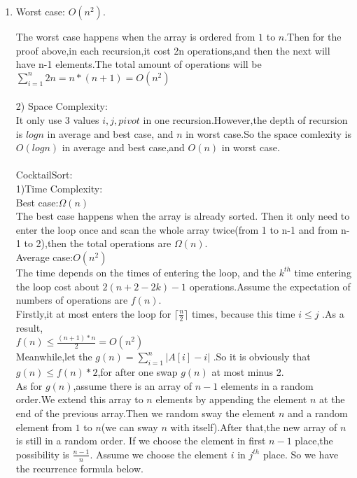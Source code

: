 \documentclass[12pt,a4paper]{article}
\makeatletter
\newtheorem*{solution}{Solution}
\theoremstyle{definition}
\renewenvironment{solution}[1][Solution] {\par\pushQED{\qed}\normalfont\topsep6\p@\@plus6\p@\relax\trivlist\item[\hskip\labelsep\bfseries#1\@addpunct{.}]\ignorespaces}{\popQED\endtrivlist\@endpefalse} \makeatother
\makeatother
\begin{document}
\begin{enumerate}
\begin{solution}
    Worst case: $O(n^2)$. \par
    The worst case happens when the array is ordered from $1$ to $n$.Then for the proof above,in each recursion,it cost 2n operations,and then the next will have n-1 elements.The total amount of operations will be $\sum_{i=1}^{n}2n=n*(n+1)=O(n^2)$\\
    \\
    2) Space Complexity:\\
    It only use 3 values  $i,j,pivot$ in one recursion.However,the depth of recursion is $log n$ in average and best case, and $n$ in worst case.So the space comlexity is $O(log n)$ in average and best case,and $O(n)$ in worst case.
    \\
    \\CocktailSort:
    \\1)Time Complexity:
    \\Best case:$\Omega (n)$
    \\The best case happens when the array is already sorted. Then it only need to enter the loop once and scan the whole array twice(from 1 to n-1 and from n-1 to 2),then the total operations are $\Omega (n)$.\\
    Average case:$O(n^2)$
    \\The time depends on the times of entering the loop, and the $k^{th}$ time entering the loop cost about $2(n+2-2k)-1$ operations.Assume the expectation of numbers of operations are $f(n)$.
    \\Firstly,it at most enters the loop for $\lceil \frac{n}{2}\rceil$ times, because this time $i\le j$ .As a result,\\$f(n)\le \frac{(n+1)*n}{2}=O(n^2)$
    \\Meanwhile,let the $g(n)=\sum_{i=1}^{n}|A[i]-i|$ .So it is obviously that $g(n)\leq f(n)*2$,for after one swap $g(n)$ at most minus 2.
    \\As for $g(n)$,assume there is an array of $n-1$ elements in a random
    order.We extend this array to $n$ elements by appending the element $n$ at the end of the previous array.Then we random sway the element $n$ and a random element from $1$ to $n$(we can sway $n$ with itself).After that,the new array of $n$ is still in a random order.
    If we choose the element in first $n-1$ place,the possibility is $\frac{n-1}{n}$. Assume we choose the element $i$ in $j^{th}$ place.
    So we have the recurrence formula below.
    

\end{solution}
\end{enumerate}
\end{document}
